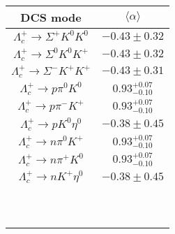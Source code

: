 \begin{table}
{\begin{tabular}{|c|c|}
			\hline
		\end{tabular}
		\begin{tabular}{|c|c|}
			\hline
			DCS mode& $\langle \alpha \rangle$\\
			\hline
			$\Lambda_{c}^{+} \to\Sigma^{+} K^{0} K^{0} $ & $      -0.43 \pm       0.32 $ \\
			$\Lambda_{c}^{+} \to\Sigma^{0} K^{0} K^{+} $ & $      -0.43 \pm       0.32 $ \\
			$\Lambda_{c}^{+} \to \Sigma^{-} K^{+} K^{+} $ & $      -0.43 \pm       0.31 $ \\
			$\Lambda_{c}^{+} \to p \pi^{0} K^{0} $ & $       0.93^{+0.07}_{-0.10} $ \\
			$\Lambda_{c}^{+} \to p \pi^{-} K^{+} $ & $       0.93 ^{+0.07}_{-0.10} $ \\
			$\Lambda_{c}^{+} \to p K^{0} \eta^{0} $ & $      -0.38 \pm       0.45 $ \\
			$\Lambda_{c}^{+} \to n \pi^{0} K^{+} $ & $       0.93^{+0.07}_{-0.10} $ \\
			$\Lambda_{c}^{+} \to n \pi^{+} K^{0} $ & $       0.93^{+0.07}_{-0.10} $ \\
			$\Lambda_{c}^{+} \to n K^{+} \eta^{0} $ & $      -0.38 \pm       0.45 $ \\	
			&\\	
			&\\	
			&\\	
			&\\	
			&\\	
			&\\	
			&\\	
			&\\	
			&\\	
			&\\	
			\hline	
		\end{tabular}
	}
\end{table}

